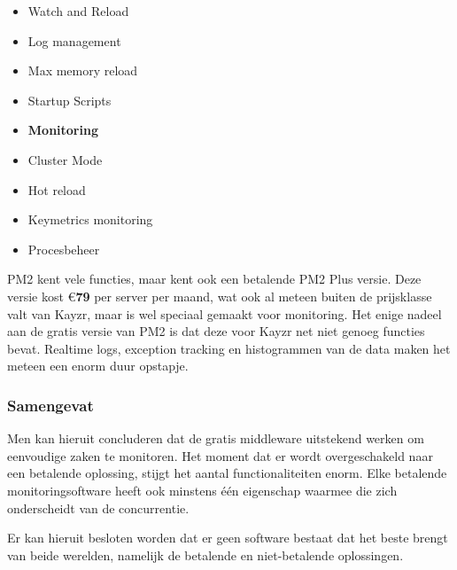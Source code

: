 \begin{itemize}
	\item Watch and Reload
	\item Log management
	\item Max memory reload
	\item Startup Scripts
	\item \textbf{Monitoring}
	\item Cluster Mode
	\item Hot reload
	\item Keymetrics monitoring
	\item Procesbeheer
\end{itemize}

PM2 kent vele functies, maar kent ook een betalende PM2 Plus versie. Deze versie kost \euro\textbf{79} per server per maand, wat ook al meteen buiten de prijsklasse valt van Kayzr, maar is wel speciaal gemaakt voor monitoring. Het enige nadeel aan de gratis versie van PM2 is dat deze voor Kayzr net niet genoeg functies bevat. Realtime logs, exception tracking en histogrammen van de data maken het meteen een enorm duur opstapje.

\subsubsection{Samengevat}
\label{sec:samengevat}
 
Men kan hieruit concluderen dat de gratis middleware uitstekend werken om eenvoudige zaken te monitoren. Het moment dat er wordt overgeschakeld naar een betalende oplossing, stijgt het aantal functionaliteiten enorm. Elke betalende monitoringsoftware heeft ook minstens één eigenschap waarmee die zich onderscheidt van de concurrentie. 

Er kan hieruit besloten worden dat er geen software bestaat dat het beste brengt van beide werelden, namelijk de betalende en niet-betalende oplossingen.





 
